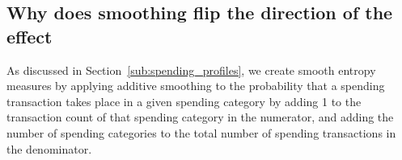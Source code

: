 







\subsection{Why does smoothing flip the direction of the effect}%
\label{sub:why_does_smoothing_flip_the_direction_of_the_effect}

As discussed in Section~\ref{sub:spending_profiles}, we create smooth entropy
measures by applying additive smoothing to the probability that a spending
transaction takes place in a given spending category by adding 1 to the
transaction count of that spending category in the numerator, and adding the
number of spending categories to the total number of spending transactions in
the denominator.


